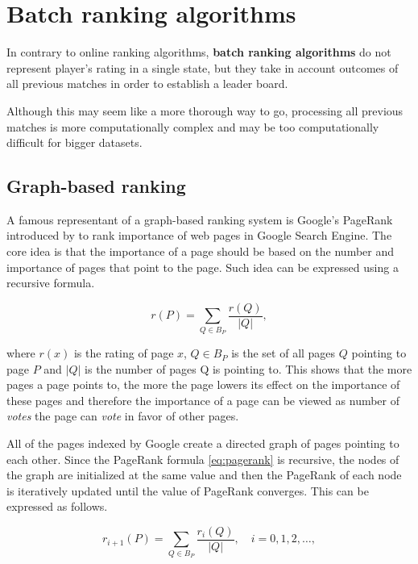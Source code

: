 \chapter{Batch ranking algorithms}
\label{ch:batch_ranking}
In contrary to online ranking algorithms, \textbf{batch ranking algorithms} do not represent player's rating in a single state, but they take in account outcomes of all previous matches in order to establish a leader board.

Although this may seem like a more thorough way to go, processing all previous matches is more computationally complex and may be too computationally difficult for bigger datasets.

\section{Graph-based ranking}
\label{sec:pagerank}
A famous representant of a graph-based ranking system is Google's PageRank introduced by \citet{PagePageRankcitationranking1998} to rank importance of web pages in Google Search Engine. The core idea is that the importance of a page should be based on the number and importance of pages that point to the page. Such idea can be expressed using a recursive formula.

\begin{equation}
r(P) = \sum_{Q \in B_P} \frac{r(Q)}{|Q|},
\label{eq:pagerank}
\end{equation}

\noindent where $r(x)$ is the rating of page $x$, $Q \in B_P$ is the set of all pages $Q$ pointing to page $P$ and $|Q|$ is the number of pages Q is pointing to. This shows that the more pages a page points to, the more the page lowers its effect on the importance of these pages and therefore the importance of a page can be viewed as number of \textit{votes} the page can \textit{vote} in favor of other pages.

All of the pages indexed by Google create a directed graph of pages pointing to each other. Since the PageRank formula \eqref{eq:pagerank} is recursive, the nodes of the graph are initialized at the same value and then the PageRank of each node is iteratively updated until the value of PageRank converges. This can be expressed as follows.

\begin{equation*}
r_{i+1}(P) = \sum_{Q \in B_P} \frac{r_i(Q)}{|Q|} ,\quad i = 0, 1, 2, \dots,
\end{equation*}

